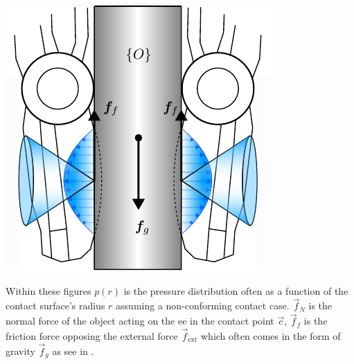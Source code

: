 \begin{center}
\begin{minipage}{.48\linewidth}
        \includegraphics[width=.95\textwidth]{chapters/modeling/fig/force-closure-schematic-crop.pdf}
    \end{minipage}%
    \vspace{15pt}
    \begin{minipage}[t]{.48\linewidth}
        \vspace{0pt}
        \captionsetup{type=figure}
        \label{fig:friction-contact-distribution}
    \end{minipage}%
    \hfill%
    \begin{minipage}[t]{.48\linewidth}
        \vspace{0pt}
        \captionsetup{type=figure}
        \label{fig:force-closure-model}
    \end{minipage}%
\end{center}

Within these figures $p(r)$ is the pressure distribution often as a function of the contact surface's radius $r$ assuming a non-conforming contact case. $\vec{f}_N$ is the normal force of the object acting on the \gls{ee} in the contact point $\vec{c}$, $\vec{f}_f$ is the friction force opposing the external force $\vec{f}_{\text{ext}}$ which often comes in the form of gravity $\vec{f}_g$ as see in .


